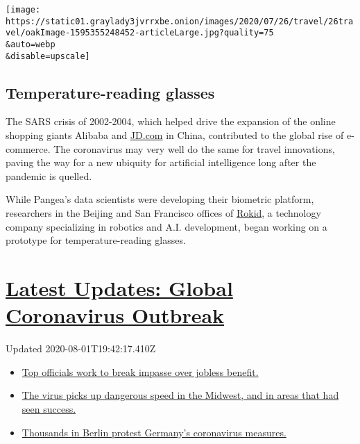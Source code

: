 \texttt{[image: https://static01.graylady3jvrrxbe.onion/images/2020/07/26/travel/26travel/oakImage-1595355248452-articleLarge.jpg?quality=75\\\&auto=webp\\\&disable=upscale]}

\hypertarget{temperature-reading-glasses}{%
\subsection{Temperature-reading
glasses}\label{temperature-reading-glasses}}

The SARS crisis of 2002-2004, which helped drive the expansion of the
online shopping giants Alibaba and \href{http://JD.com}{JD.com} in
China, contributed to the global rise of e-commerce. The coronavirus may
very well do the same for travel innovations, paving the way for a new
ubiquity for artificial intelligence long after the pandemic is quelled.

While Pangea's data scientists were developing their biometric platform,
researchers in the Beijing and San Francisco offices of
\href{https://www.rokid.com/}{Rokid}, a technology company specializing
in robotics and A.I. development, began working on a prototype for
temperature-reading glasses.

\hypertarget{latest-updates-global-coronavirus-outbreak}{%
\section{\texorpdfstring{\href{https://www.nytimes3xbfgragh.onion/2020/08/01/world/coronavirus-covid-19.html?action=click\&pgtype=Article\&state=default\&region=MAIN_CONTENT_1\&context=storylines_live_updates}{Latest
Updates: Global Coronavirus
Outbreak}}{Latest Updates: Global Coronavirus Outbreak}}\label{latest-updates-global-coronavirus-outbreak}}

Updated 2020-08-01T19:42:17.410Z

\begin{itemize}
\tightlist
\item
  \href{https://www.nytimes3xbfgragh.onion/2020/08/01/world/coronavirus-covid-19.html?action=click\&pgtype=Article\&state=default\&region=MAIN_CONTENT_1\&context=storylines_live_updates\#link-3ac56579}{Top
  officials work to break impasse over jobless benefit.}
\item
  \href{https://www.nytimes3xbfgragh.onion/2020/08/01/world/coronavirus-covid-19.html?action=click\&pgtype=Article\&state=default\&region=MAIN_CONTENT_1\&context=storylines_live_updates\#link-8796723}{The
  virus picks up dangerous speed in the Midwest, and in areas that had
  seen success.}
\item
  \href{https://www.nytimes3xbfgragh.onion/2020/08/01/world/coronavirus-covid-19.html?action=click\&pgtype=Article\&state=default\&region=MAIN_CONTENT_1\&context=storylines_live_updates\#link-25930521}{Thousands
  in Berlin protest Germany's coronavirus measures.}
\end{itemize}

